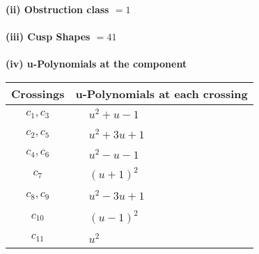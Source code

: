 \documentclass[1p]{elsarticle_modified}
\theoremstyle{definition}
\begin{document}
\flushleft \textbf{(ii) Obstruction class $= 1$}\\~\\
\flushleft \textbf{(iii) Cusp Shapes $= 41$}\\~\\
\newpage\renewcommand{\arraystretch}{1}
\flushleft \textbf{(iv) u-Polynomials at the component}\newline \\
\begin{tabular}{m{50pt}|m{274pt}}
Crossings & \hspace{64pt}u-Polynomials at each crossing \\
\hline $$\begin{aligned}c_{1},c_{3}\end{aligned}$$&$\begin{aligned}
&u^2+u-1
\end{aligned}$\\
\hline $$\begin{aligned}c_{2},c_{5}\end{aligned}$$&$\begin{aligned}
&u^2+3 u+1
\end{aligned}$\\
\hline $$\begin{aligned}c_{4},c_{6}\end{aligned}$$&$\begin{aligned}
&u^2- u-1
\end{aligned}$\\
\hline $$\begin{aligned}c_{7}\end{aligned}$$&$\begin{aligned}
&(u+1)^2
\end{aligned}$\\
\hline $$\begin{aligned}c_{8},c_{9}\end{aligned}$$&$\begin{aligned}
&u^2-3 u+1
\end{aligned}$\\
\hline $$\begin{aligned}c_{10}\end{aligned}$$&$\begin{aligned}
&(u-1)^2
\end{aligned}$\\
\hline $$\begin{aligned}c_{11}\end{aligned}$$&$\begin{aligned}
&u^2
\end{aligned}$\\
\hline
\end{tabular}\\~\\
\end{document}
